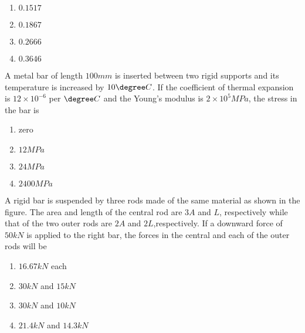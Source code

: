 	\begin{enumerate}
                \item $0.1517$
                \item $0.1867$
                \item $0.2666$
                \item $0.3646$
        \end{enumerate}
\item A metal bar of length $100 mm$ is inserted between two rigid supports and its temperature is increased by $10{\degree}C$. If the coefficient of thermal expansion is $12 \times 10^{-6}$ per ${\degree}C$ and the Young's modulus is $2 \times 10^5 MPa$, the stress in the bar is 
	\begin{enumerate}
                \item zero
                \item $12 MPa$
                \item $24 MPa$
                \item $2400 MPa$
        \end{enumerate}
\item A rigid bar is suspended by three rods made of the same material as shown in the figure. The area and length of the central rod are $3A$ and $L$, respectively while that of the two outer rods are $2A$ and $2L$,respectively. If a downward force of $50 kN$ is applied to the right bar, the forces in the central and each of the outer rods will be\\
	\begin{center}	 \end{center}
		\begin{enumerate}
                \item $16.67 kN$ each
                \item $30 kN$ and $15 kN$
                \item $30 kN$ and $10 kN$
                \item $21.4 kN$ and $14.3 kN$
        \end{enumerate}
